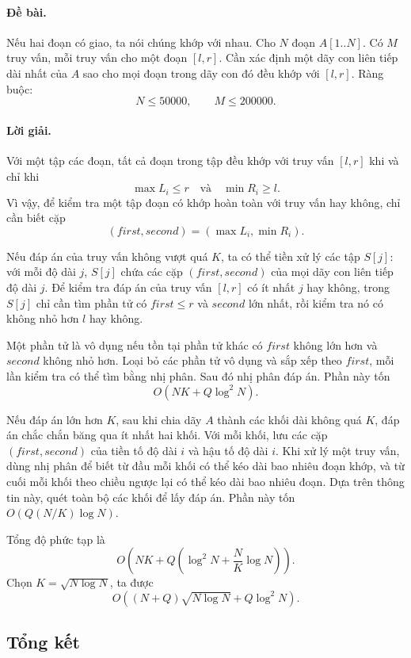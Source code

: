 \documentclass[11pt]{article}
\begin{document}
\paragraph{Đề bài.}
Nếu hai đoạn có giao, ta nói chúng khớp với nhau. Cho \(N\) đoạn
\(A[1..N]\). Có \(M\) truy vấn, mỗi truy vấn cho một đoạn \([l,r]\). Cần xác
định một dãy con liên tiếp dài nhất của \(A\) sao cho mọi đoạn trong dãy con
đó đều khớp với \([l,r]\). Ràng buộc:
\[
  N\le 50000,\qquad M\le 200000.
\]

\paragraph{Lời giải.}
Với một tập các đoạn, tất cả đoạn trong tập đều khớp với truy vấn \([l,r]\)
khi và chỉ khi
\[
  \max L_i \le r \quad\text{và}\quad \min R_i \ge l.
\]
Vì vậy, để kiểm tra một tập đoạn có khớp hoàn toàn với truy vấn hay không,
chỉ cần biết cặp
\[
  (\mathit{first},\mathit{second})=(\max L_i,\min R_i).
\]

Nếu đáp án của truy vấn không vượt quá \(K\), ta có thể tiền xử lý các tập
\(S[j]\): với mỗi độ dài \(j\), \(S[j]\) chứa các cặp
\((\mathit{first},\mathit{second})\) của mọi dãy con liên tiếp độ dài \(j\).
Để kiểm tra đáp án của truy vấn \([l,r]\) có ít nhất \(j\) hay không, trong
\(S[j]\) chỉ cần tìm phần tử có \(\mathit{first}\le r\) và
\(\mathit{second}\) lớn nhất, rồi kiểm tra nó có không nhỏ hơn \(l\) hay
không.

Một phần tử là vô dụng nếu tồn tại phần tử khác có
\(\mathit{first}\) không lớn hơn và \(\mathit{second}\) không nhỏ hơn. Loại
bỏ các phần tử vô dụng và sắp xếp theo \(\mathit{first}\), mỗi lần kiểm tra
có thể tìm bằng nhị phân. Sau đó nhị phân đáp án. Phần này tốn
\[
  O(NK+Q\log^2 N).
\]

Nếu đáp án lớn hơn \(K\), sau khi chia dãy \(A\) thành các khối dài không quá
\(K\), đáp án chắc chắn băng qua ít nhất hai khối. Với mỗi khối, lưu các cặp
\((\mathit{first},\mathit{second})\) của tiền tố độ dài \(i\) và hậu tố độ dài
\(i\). Khi xử lý một truy vấn, dùng nhị phân để biết từ đầu mỗi khối có thể
kéo dài bao nhiêu đoạn khớp, và từ cuối mỗi khối theo chiều ngược lại có thể
kéo dài bao nhiêu đoạn. Dựa trên thông tin này, quét toàn bộ các khối để lấy
đáp án. Phần này tốn \(O(Q(N/K)\log N)\).

Tổng độ phức tạp là
\[
  O\left(NK+Q\left(\log^2N+\frac{N}{K}\log N\right)\right).
\]
Chọn \(K=\sqrt{N\log N}\), ta được
\[
  O\left((N+Q)\sqrt{N\log N}+Q\log^2N\right).
\]

\subsection{Tổng kết}
\end{document}
